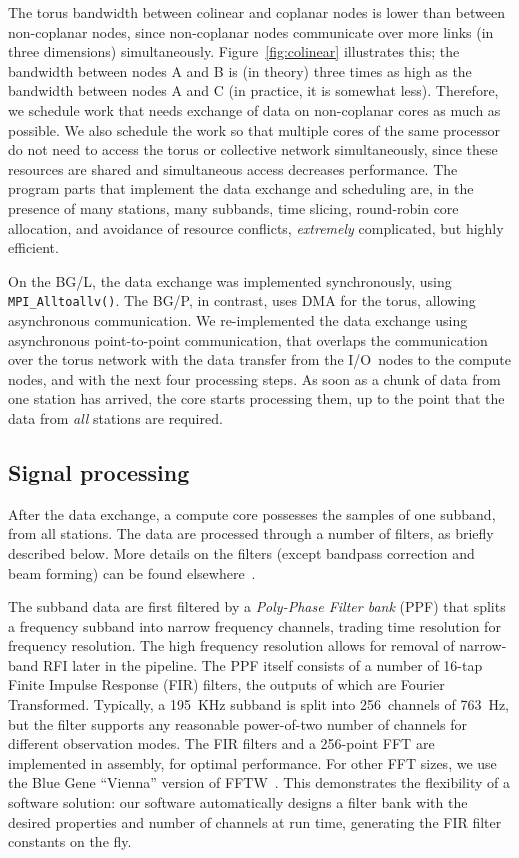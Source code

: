 \documentclass{sig-alternate}
\begin{document}
The torus bandwidth between colinear and coplanar nodes is lower than between
non-coplanar nodes, since non-coplanar nodes communicate over more links
(in three dimensions) simultaneously.
Figure~\ref{fig:colinear} illustrates this; the bandwidth between nodes
\textsf{A} and \textsf{B} is (in theory) three times as high as the bandwidth
between nodes \textsf{A} and \textsf{C} (in practice, it is somewhat less).
Therefore, we schedule work that needs exchange of data 
on non-coplanar cores as much as possible.
We also schedule the work so that multiple cores of the same processor do not
need to access the torus or collective network simultaneously, since these
resources are shared and simultaneous access decreases performance.
The program parts that implement the data exchange and scheduling are, in the
presence of many stations, many subbands, time slicing, round-robin core
allocation, and avoidance of resource conflicts, \emph{extremely\/}
complicated, but highly efficient.

On the BG/L, the data exchange was implemented synchronously, using
\texttt{MPI\_Alltoallv()}.
The BG/P, in contrast, uses DMA for the torus, allowing asynchronous
communication.
We re-implemented the data exchange using asynchronous point-to-point
communication, that overlaps the communication over the torus network with 
the data transfer from the I/O~nodes to the compute nodes, and with
the next four processing steps.
As soon as a chunk of data from one station has arrived, the core starts
processing them, up to the point that the data from \emph{all\/} stations
are required. 


\subsection{Signal processing}
\label{sec:signal-processing}

After the data exchange, a compute core possesses the samples of one subband,
from all stations.
The data are processed through a number of filters, as briefly described below.
More details on the filters (except bandpass correction and beam forming)
can be found elsewhere~\cite{Romein:06}.

The subband data are first filtered by a \emph{Poly-Phase Filter bank\/} (PPF) that
splits a frequency subband into narrow frequency channels, trading time
resolution for frequency resolution.
The high frequency resolution allows for removal of narrow-band RFI later in
the pipeline.
The PPF itself consists of a number of 16-tap Finite Impulse Response (FIR)
filters, the outputs of which are Fourier Transformed.
Typically, a 195~KHz subband is split into 256~channels of 763~Hz, but the
filter supports any reasonable power-of-two number of channels for different
observation modes.
The FIR filters and a 256-point FFT are implemented in assembly, for optimal
performance.
For other FFT sizes, we use the Blue Gene ``Vienna'' version of
FFTW~\cite{Lorenz:05}.
This demonstrates the flexibility of a software solution: our software
automatically designs a filter bank with the desired properties and
number of channels at run time, generating the FIR filter constants on
the fly.
\end{document}

